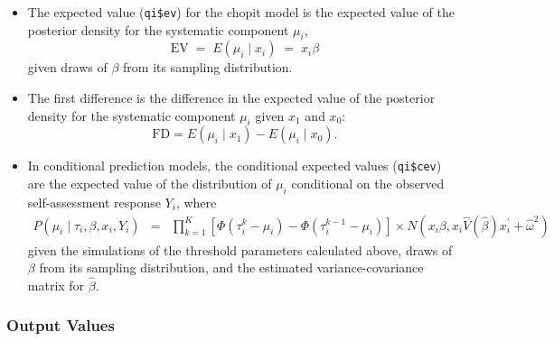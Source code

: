 \begin{itemize}
\item The expected value ({\tt qi\$ev}) for the {\sc chopit} model
is the expected value of the posterior density for the systematic
component $\mu_i$,
\begin{equation*}
\textrm{EV} \; = \; E(\mu_i \mid x_i) \; = \; x_i \beta
\end{equation*}
given draws of $\beta$ from its sampling distribution.  

\item The first difference is the difference in the expected value of
the posterior density for the systematic component $\mu_i$ given $x_1$
and $x_0$:
\begin{equation*}
\textrm{FD} = E(\mu_i \mid x_1) - E(\mu_i \mid x_0).
\end{equation*}

\item In conditional prediction models, the conditional expected
values ({\tt qi\$cev}) are the expected value of the distribution of
$\mu_i$ conditional on the observed self-assessment response $Y_i$, 
where
\begin{eqnarray*}
P(\mu_i \mid \tau_i, \beta, x_i, Y_i) &=& \prod_{k=1}^K [ \Phi(\tau_i^k -
\mu_i) - \Phi(\tau_i^{k-1} - \mu_i) ] \times N(x_i \beta, x_i
\widehat{V}(\widehat{\beta}) x_i^{\prime} + \widehat{\omega}^2)
\end{eqnarray*}
given the simulations of the threshold parameters calculated above,
draws of $\beta$ from its sampling distribution, and the
estimated variance-covariance matrix for $\widehat{\beta}$.

\end{itemize}

\subsubsection{Output Values}

